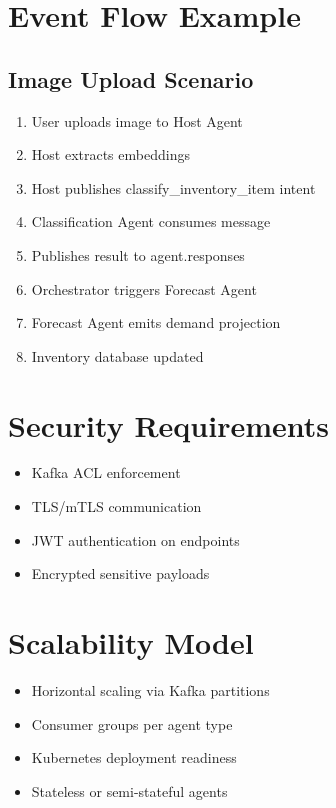 \documentclass[12pt]{article}
\begin{document}
\section{Event Flow Example}

\subsection{Image Upload Scenario}

\begin{enumerate}
    \item User uploads image to Host Agent
    \item Host extracts embeddings
    \item Host publishes classify\_inventory\_item intent
    \item Classification Agent consumes message
    \item Publishes result to agent.responses
    \item Orchestrator triggers Forecast Agent
    \item Forecast Agent emits demand projection
    \item Inventory database updated
\end{enumerate}

\section{Security Requirements}

\begin{itemize}
    \item Kafka ACL enforcement
    \item TLS/mTLS communication
    \item JWT authentication on endpoints
    \item Encrypted sensitive payloads
\end{itemize}

\section{Scalability Model}

\begin{itemize}
    \item Horizontal scaling via Kafka partitions
    \item Consumer groups per agent type
    \item Kubernetes deployment readiness
    \item Stateless or semi-stateful agents
\end{itemize}
\end{document}

